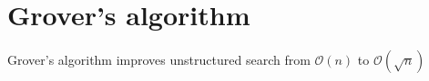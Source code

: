 \chapter{Grover's algorithm}
Grover's algorithm improves unstructured search from $\mathcal{O}(n)$ to $\mathcal{O}(\sqrt{n})$




